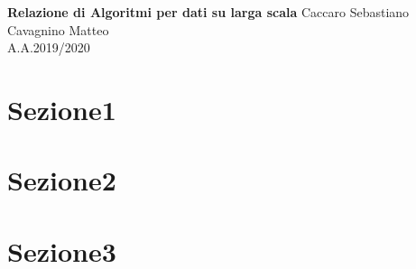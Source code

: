 \documentclass[a4paper,12pt]{article}
\begin{document}
\begin{titlepage}
\begin{center}
	\Large{\textbf{Relazione  di Algoritmi per dati su larga scala}}
\vfill
\normalsize{Caccaro Sebastiano}\\
\normalsize{Cavagnino Matteo}\\
\normalsize{A.A.2019/2020}
\end{center}
\end{titlepage}
\tableofcontents

\clearpage

\section{Sezione1}
\section{Sezione2}
\section{Sezione3}
\end{document}
